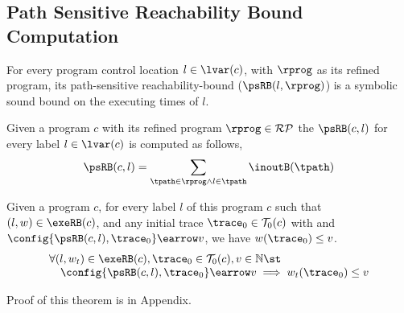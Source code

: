 \subsection{Path Sensitive Reachability Bound Computation}
\label{sec:psrbcompute}
For every program control location $l \in \lvar(c)$, with $\rprog$ as its refined program,
its path-sensitive reachability-bound ($\psRB(l, \rprog)$) is a symbolic sound bound on the executing times of $l$.

 \begin{defn}
  \label{def:label_psrb}
Given a program $c$ with its refined program $\rprog \in \mathcal{RP}$
the $\psRB(c, l)$ for every label $l \in \lvar(c)$ is computed as follows,
\\
\[ \psRB(c, l) = \sum\limits_{\tpath \in \rprog \land 
l \in \tpath} \inoutB(\tpath)\]
 \end{defn}
\begin{thm}
  \label{thm:pathsensitive_rb_soundness}
Given a program ${c}$, for every label $l$ of this program $c$ such that $(l, w) \in \exeRB(c)$, 
and any initial trace $\trace_0 \in \mathcal{T}_0(c)$ with 
and $\config{\psRB(c, l), \trace_0} \earrow v$,
we have $ w(\trace_0) \leq v $.
%
\[
  \begin{array}{l}
  \forall (l, w_{t}) \in \exeRB(c),
  \trace_0 \in \mathcal{T}_0(c), 
  v \in \mathbb{N} \st
  \\ \quad
  \config{\psRB(c, l), \trace_0} \earrow v
  \implies
  w_{t}(\trace_0) \leq v
  \end{array}
  \]
\end{thm}
%
Proof of this theorem is in Appendix.